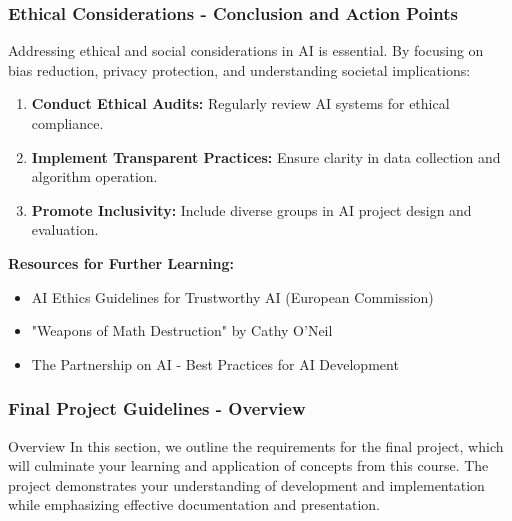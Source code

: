 \documentclass[aspectratio=169]{beamer}
\begin{document}
\begin{frame}[fragile]
    \frametitle{Ethical Considerations - Conclusion and Action Points}
    Addressing ethical and social considerations in AI is essential. By focusing on bias reduction, privacy protection, and understanding societal implications:
    \begin{enumerate}
        \item \textbf{Conduct Ethical Audits:} Regularly review AI systems for ethical compliance.
        \item \textbf{Implement Transparent Practices:} Ensure clarity in data collection and algorithm operation.
        \item \textbf{Promote Inclusivity:} Include diverse groups in AI project design and evaluation.
    \end{enumerate}

    \textbf{Resources for Further Learning:}
    \begin{itemize}
        \item AI Ethics Guidelines for Trustworthy AI (European Commission)
        \item "Weapons of Math Destruction" by Cathy O'Neil
        \item The Partnership on AI - Best Practices for AI Development
    \end{itemize}
\end{frame}

\begin{frame}[fragile]
    \frametitle{Final Project Guidelines - Overview}
    \begin{block}{Overview}
        In this section, we outline the requirements for the final project, 
        which will culminate your learning and application of concepts from this course.
        The project demonstrates your understanding of development and implementation 
        while emphasizing effective documentation and presentation.
    \end{block}
\end{frame}
\end{document}
